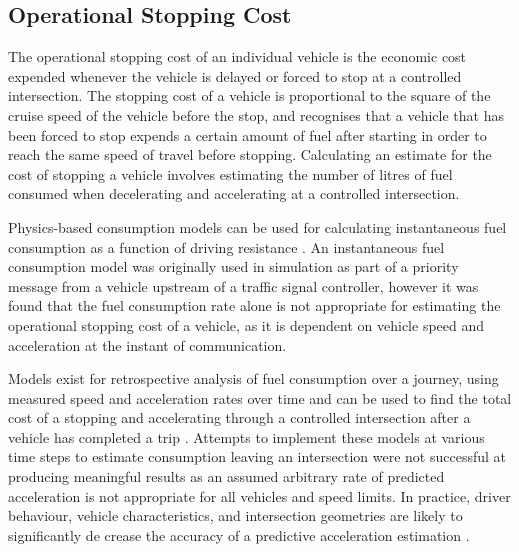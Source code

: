 \subsection{Operational Stopping Cost}

The operational stopping cost of an individual vehicle is the economic cost expended whenever the vehicle is delayed or forced to stop at a controlled intersection. The stopping cost of a vehicle is proportional to the square of the cruise speed of the vehicle before the stop, and recognises that a vehicle that has been forced to stop expends a certain amount of fuel after starting in order to reach the same speed of travel before stopping. Calculating an estimate for the cost of stopping a vehicle involves estimating the number of litres of fuel consumed when decelerating and accelerating at a controlled intersection.

Physics-based consumption models can be used for calculating instantaneous fuel consumption as a function of driving resistance \cite{kesting2013traffic}. An instantaneous fuel consumption model was originally used in simulation as part of a priority message from a vehicle upstream of a traffic signal controller, however it was found that the fuel consumption rate alone is not appropriate for estimating the operational stopping cost of a vehicle, as it is dependent on vehicle speed and acceleration at the instant of communication.

Models exist for retrospective analysis of fuel consumption over a journey, using measured speed and acceleration rates over time and can be used to find the total cost of a stopping and accelerating through a controlled intersection after a vehicle has completed a trip \cite{kesting2013traffic,akcelik2003fuel,trieber2008congestion}. Attempts to implement these models at various time steps to estimate consumption leaving an intersection were not successful at producing meaningful results as an assumed arbitrary rate of predicted acceleration is not appropriate for all vehicles and speed limits. In practice, driver behaviour, vehicle characteristics, and intersection geometries are likely to significantly de crease the accuracy of a predictive acceleration estimation \cite{kesting2013traffic}.

